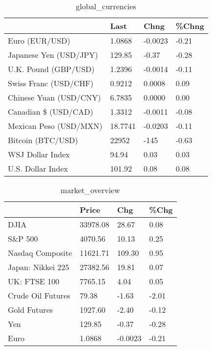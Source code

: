 \documentclass{article}%
\begin{document}
%


\begin{table}[htbp]%
\caption{global\_currencies}%
\centering%
\begin{adjustbox}{width=1\textwidth}%
\begin{tabular}{llll}
\toprule
                       &    Last &    Chng & \%Chng \\
\midrule
        Euro (EUR/USD) &  1.0868 & -0.0023 & -0.21 \\
Japanese Yen (USD/JPY) &  129.85 &   -0.37 & -0.28 \\
  U.K. Pound (GBP/USD) &  1.2396 & -0.0014 & -0.11 \\
 Swiss Franc (USD/CHF) &  0.9212 &  0.0008 &  0.09 \\
Chinese Yuan (USD/CNY) &  6.7835 &  0.0000 &  0.00 \\
  Canadian \$ (USD/CAD) &  1.3312 & -0.0011 & -0.08 \\
Mexican Peso (USD/MXN) & 18.7741 & -0.0203 & -0.11 \\
     Bitcoin (BTC/USD) &   22952 &    -145 & -0.63 \\
      WSJ Dollar Index &   94.94 &    0.03 &  0.03 \\
     U.S. Dollar Index &  101.92 &    0.08 &  0.08 \\
\bottomrule
\end{tabular}
%
\end{adjustbox}%
\end{table}

%


\begin{table}[htbp]%
\caption{market\_overview}%
\centering%
\begin{adjustbox}{width=1\textwidth}%
\begin{tabular}{llll}
\toprule
                  &    Price &     Chg &  \%Chg \\
\midrule
             DJIA & 33978.08 &   28.67 &  0.08 \\
          S\&P 500 &  4070.56 &   10.13 &  0.25 \\
 Nasdaq Composite & 11621.71 &  109.30 &  0.95 \\
Japan: Nikkei 225 & 27382.56 &   19.81 &  0.07 \\
     UK: FTSE 100 &  7765.15 &    4.04 &  0.05 \\
Crude Oil Futures &    79.38 &   -1.63 & -2.01 \\
     Gold Futures &  1927.60 &   -2.40 & -0.12 \\
              Yen &   129.85 &   -0.37 & -0.28 \\
             Euro &   1.0868 & -0.0023 & -0.21 \\
\bottomrule
\end{tabular}
%
\end{adjustbox}%
\end{table}

%
\end{document}

